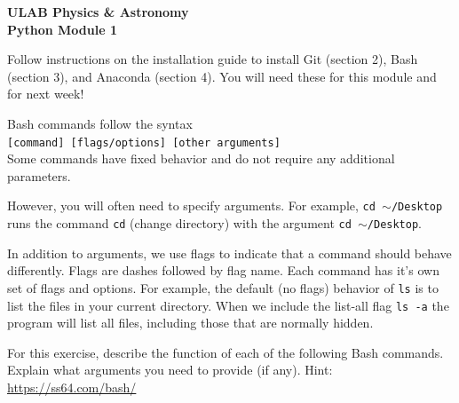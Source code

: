 \documentclass[addpoints,12pt]{exam}
\numberwithin{equation}{section}
\begin{document}
	
	\vspace*{-3cm}{\footnotesize\hfill Copyright \copyright\ 2021, Undergraduate Lab at Berkeley}
	\vspace{0.5cm}
	
	\begin{center}
		\textbf{\Large{ULAB Physics \& Astronomy\\Python Module 1}}
	\end{center}
	
	\begin{questions}
		
		\question[0] Follow instructions on the installation guide to install Git (section 2), Bash (section 3), and Anaconda (section 4). You will need these for this module and for next week!
		
		\question[10] Bash commands follow the syntax \\\verb|[command] [flags/options] [other arguments]|\\Some commands have fixed behavior and do not require any additional parameters. 
		
		However, you will often need to specify arguments. For example, \verb|cd |$\sim$\verb|/Desktop| runs the command \verb|cd| (change directory) with the argument \verb|cd |$\sim$\verb|/Desktop|.
		
		In addition to arguments, we use flags to indicate that a command should behave differently. Flags are dashes followed by flag name. Each command has it's own set of flags and options. For example, the default (no flags) behavior of \verb|ls| is to list the files in your current directory. When we include the list-all flag  \verb|ls -a| the program will list all files, including those that are normally hidden.
		
		
		For this exercise, describe the function of each of the following Bash commands. Explain what arguments you need to provide (if any). Hint: \hyperref{https://ss64.com/bash/}{}{}{https://ss64.com/bash/}
		
\end{questions}
\end{document}
